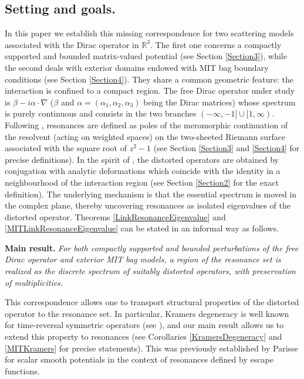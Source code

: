 \documentclass[a4paper, 12pt]{amsart}
\numberwithin{equation}{section}
\newcommand{\R}{\mathbb{R}} %
\begin{document}
\subsection*{Setting and goals.} In this paper we establish this missing correspondence for two scattering models associated with the Dirac operator in $\R^3$. The first one concerns a compactly supported and bounded matrix-valued potential (see Section \ref{Section3}), while the second deals with exterior domains endowed with MIT bag boundary conditions (see Section \ref{Section4}). They share a common geometric feature: the interaction is confined to a compact region. The free Dirac operator under study is $\beta-i\alpha\cdot\nabla$ ($\beta$ and $\alpha=(\alpha_1,\alpha_2,\alpha_3)$ being the Dirac matrices) whose spectrum is purely continuous and consists in the two branches $(-\infty,-1]\cup[1,\infty)$. Following \cite{SjZw91,Du25}, resonances are defined as poles of the meromorphic continuation of the resolvent (acting on weighted spaces) on the two-sheeted Riemann surface associated with the square root of $z^2-1$ (see Section \ref{Section3} and \ref{Section4} for precise definitions). In the spirit of \cite{Hu86,Kh07}, the distorted operators are obtained by conjugation with analytic deformations which coincide with the identity in a neighbourhood of the interaction region (see Section \ref{Section2} for the exact definition). The underlying mechanism is that the essential spectrum is moved in the complex plane, thereby uncovering resonances as isolated eigenvalues of the distorted operator. Theorems \ref{LinkResonanceEigenvalue} and \ref{MITLinkResonanceEigenvalue} can be stated in an informal way as follows.

\medskip

\textbf{Main result.} \textit{For both compactly supported and bounded perturbations of the free Dirac operator and exterior MIT bag models, a region of the resonance set is realized as the discrete spectrum of suitably distorted operators, with preservation of multiplicities.}

\medskip

This correspondence allows one to transport structural properties of the distorted operator to the resonance set. In particular, Kramers degeneracy is well known for time-reversal symmetric operators (see \cite[Section 10.4.5]{ReWo15}), and our main result allows us to extend this property to resonances (see  Corollaries \ref{KramersDegeneracy} and \ref{MITKramers} for precise statements). This was previously established by Parisse \cite{Pa91} for scalar smooth potentials in the context of resonances defined by escape functions.
\end{document}
